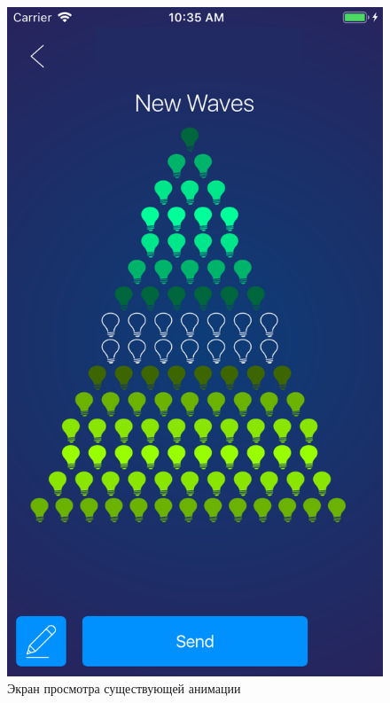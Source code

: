 ~
\begin{figure}[H]
\centering
	\includegraphics[scale=0.2]{figures/userGuide/previewDefault.png}
	\caption{Экран просмотра существующей анимации}
	\label{fig:develop:userGuide:previewDefault}
\end{figure}

